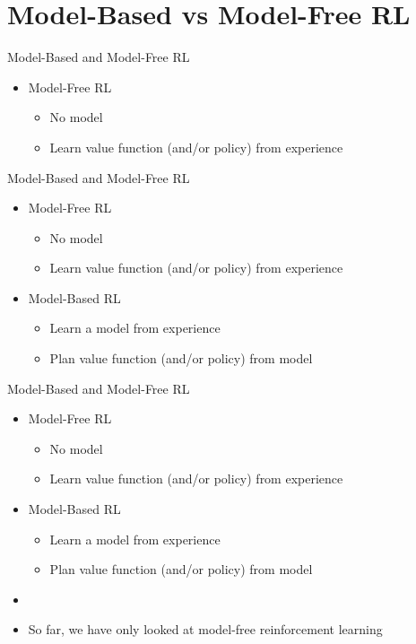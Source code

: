 \section{Model-Based vs Model-Free RL}
\begin{frame}{Model-Based and Model-Free RL}
\begin{itemize}
    \item Model-Free RL
    \begin{itemize}
        \item No model
        \item Learn value function (and/or policy) from experience
    \end{itemize}
\end{itemize}
\end{frame}

\begin{frame}{Model-Based and Model-Free RL}
\begin{itemize}
    \item Model-Free RL
    \begin{itemize}
        \item No model
        \item Learn value function (and/or policy) from experience
    \end{itemize}
    \item Model-Based RL
    \begin{itemize}
        \item Learn a model from experience
        \item Plan value function (and/or policy) from model
    \end{itemize}
\end{itemize}
\end{frame}

\begin{frame}{Model-Based and Model-Free RL}
\begin{itemize}
    \item Model-Free RL
    \begin{itemize}
        \item No model
        \item Learn value function (and/or policy) from experience
    \end{itemize}
    \item Model-Based RL
    \begin{itemize}
        \item Learn a model from experience
        \item Plan value function (and/or policy) from model
    \end{itemize}
    \item[]
    \item So far, we have only looked at model-free reinforcement learning
\end{itemize}
\end{frame}
